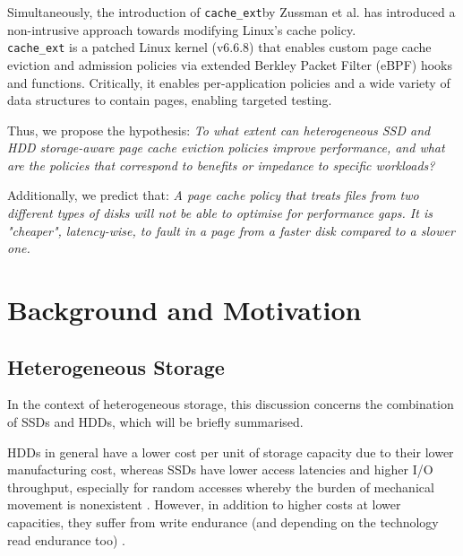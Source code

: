 \documentclass[11pt,sigconf,nonacm]{acmart}
\newcommand{\cacheExt}{\texttt{cache\_ext}}
\begin{document}
Simultaneously, the introduction of \cacheExt by Zussman et al. has introduced a non-intrusive approach towards modifying Linux's cache policy. \\ \texttt{cache\_ext} is a patched Linux kernel (v6.6.8) that enables custom page cache eviction and admission policies via extended Berkley Packet Filter (eBPF) hooks and functions. Critically, it enables per-application policies and a wide variety of data structures to contain pages, enabling targeted testing.


Thus, we propose the hypothesis: \textit{To what extent can heterogeneous SSD and HDD storage-aware page cache eviction policies improve performance, and what are the policies that correspond to benefits or impedance to specific workloads?}

Additionally, we predict that: \textit{A page cache policy that treats files from two different \textit{types} of disks will not be able to optimise for performance gaps. It is "cheaper", latency-wise, to fault in a page from a faster disk compared to a slower one.}



\section{Background and Motivation}

\subsection{Heterogeneous Storage}

In the context of heterogeneous storage, this discussion concerns the combination of SSDs and HDDs, which will be briefly summarised.

HDDs in general have a lower cost per unit of storage capacity due to their lower manufacturing cost, whereas SSDs have lower access latencies and higher I/O throughput, especially for random accesses whereby the burden of mechanical movement is nonexistent \cite{arch, tcostorage}. However, in addition to higher costs at lower capacities, they suffer from write endurance (and depending on the technology read endurance too) \cite{arch, tcostorage, heterogeneousssd}. 
\end{document}

